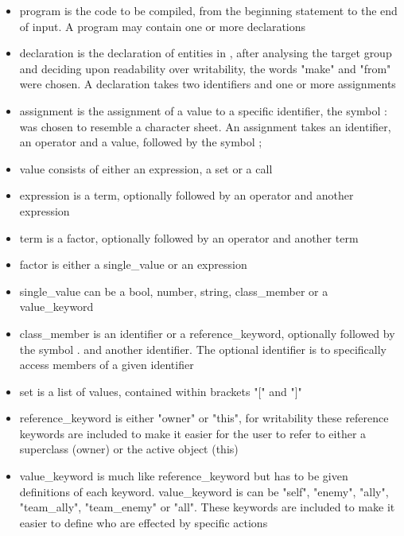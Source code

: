 \pagebreak
\begin{itemize}
\item program is the code to be compiled, from the beginning statement to the end of input.
A program may contain one or more declarations

\item declaration is the declaration of entities in \langname{}, after analysing the target group
and deciding upon readability over writability, the words "make" and "from" were chosen.
A declaration takes two identifiers and one or more assignments

\item assignment is the assignment of a value to a specific identifier, the symbol : was chosen
to resemble a character sheet.
An assignment takes an identifier, an operator and a value, followed by the symbol ;

\item value consists of either an expression, a set or a call

\item expression is a term, optionally followed by an operator and another expression

\item term is a factor, optionally followed by an operator and another term

\item factor is either a single\_value or an expression

\item single\_value can be a bool, number, string, class\_member or a value\_keyword

\item class\_member is an identifier or a reference\_keyword, optionally followed
by the symbol . and another identifier. The optional identifier is to specifically access members
of a given identifier

\item set is a list of values, contained within brackets "[" and "]"

\item reference\_keyword is either "owner" or "this", for writability these reference keywords are included
to make it easier for the user to refer to either a superclass (owner) or the active object (this)

\item value\_keyword is much like reference\_keyword but has to be given definitions of each keyword.
value\_keyword is can be "self", "enemy", "ally", "team\_ally", "team\_enemy" or "all".
These keywords are included to make it easier to define who are effected by specific actions


\end{itemize}
